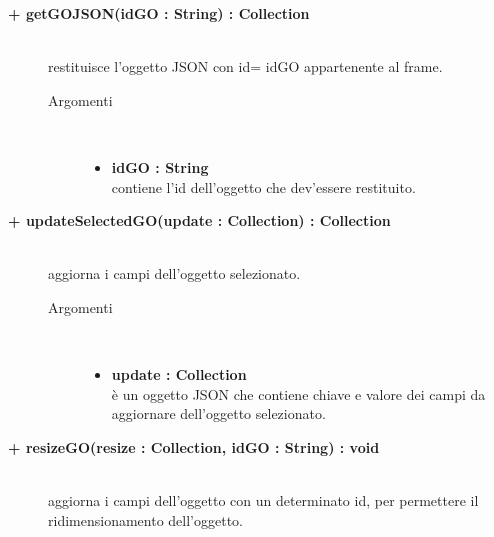 \begin{description}
\begin{description}
\begin{description}
\begin{description}
\end{description}

\end{description}

\begin{description}
		\item[\textbf{+ getGOJSON(idGO : String) : Collection			}] \hfill \\
			restituisce l'oggetto JSON con id= idGO appartenente al frame.   

\begin{description}
			\item[Argomenti] \hfill \\
				\begin{itemize}
						\item \textbf{idGO : String			} \hfill \\
					contiene l'id dell'oggetto che dev'essere restituito.
				\end{itemize}

\end{description}

\end{description}

\begin{description}
		\item[\textbf{+ updateSelectedGO(update : Collection) : Collection			}] \hfill \\
			aggiorna i campi dell'oggetto selezionato.   

\begin{description}
			\item[Argomenti] \hfill \\
				\begin{itemize}
						\item \textbf{update : Collection			} \hfill \\
					è un oggetto JSON che contiene chiave e valore dei campi da aggiornare dell'oggetto selezionato.
				\end{itemize}

\end{description}

\end{description}

\begin{description}
		\item[\textbf{+ resizeGO(resize : Collection, idGO : String) : void			}] \hfill \\
			aggiorna i campi dell'oggetto con un determinato id, per permettere il ridimensionamento dell'oggetto.    


\end{description}
\end{description}
\end{description}
